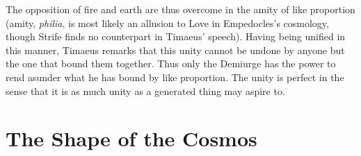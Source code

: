 The opposition of fire and earth are thus overcome in the amity of like proportion (amity, \emph{philia}, is most likely an allusion to Love in Empedocles's cosmology, though Strife finds no counterpart in Timaeus' speech). Having being unified in this manner, Timaeus remarks that this unity cannot be undone by anyone but the one that bound them together. Thus only the Demiurge has the power to rend asunder what he has bound by like proportion. The unity is perfect in the sense that it is as much unity as a generated thing may aspire to.


\section{The Shape of the Cosmos} %
\label{sec:the_shape_of_the_cosmos}






